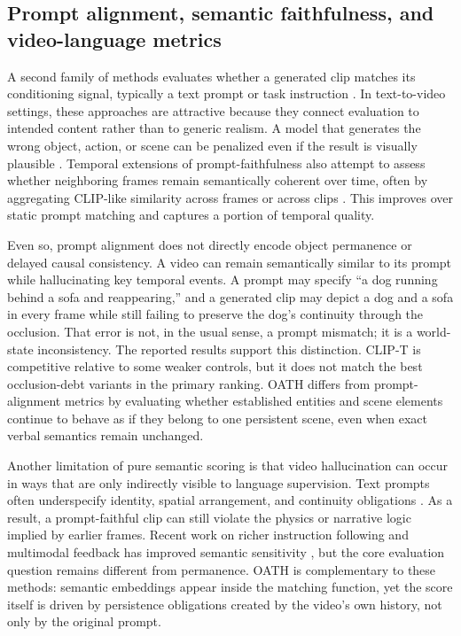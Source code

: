 \documentclass{article}
\begin{document}
\subsection{Prompt alignment, semantic faithfulness, and video-language metrics}

A second family of methods evaluates whether a generated clip matches its conditioning signal, typically a text prompt or task instruction \cite{clip2021,clipscore2021,tifa2023,pickscore2023,blip2_2023,instructblip2023}. In text-to-video settings, these approaches are attractive because they connect evaluation to intended content rather than to generic realism. A model that generates the wrong object, action, or scene can be penalized even if the result is visually plausible \cite{videopoet2024,modelscope_t2v2023,zeroscope2023}. Temporal extensions of prompt-faithfulness also attempt to assess whether neighboring frames remain semantically coherent over time, often by aggregating CLIP-like similarity across frames or across clips \cite{clip2021,clipscore2021,videoscore2024,t2vcompbench2024}. This improves over static prompt matching and captures a portion of temporal quality.

Even so, prompt alignment does not directly encode object permanence or delayed causal consistency. A video can remain semantically similar to its prompt while hallucinating key temporal events. A prompt may specify ``a dog running behind a sofa and reappearing,'' and a generated clip may depict a dog and a sofa in every frame while still failing to preserve the dog's continuity through the occlusion. That error is not, in the usual sense, a prompt mismatch; it is a world-state inconsistency. The reported results support this distinction. CLIP-T is competitive relative to some weaker controls, but it does not match the best occlusion-debt variants in the primary ranking. OATH differs from prompt-alignment metrics by evaluating whether established entities and scene elements continue to behave as if they belong to one persistent scene, even when exact verbal semantics remain unchanged.

Another limitation of pure semantic scoring is that video hallucination can occur in ways that are only indirectly visible to language supervision. Text prompts often underspecify identity, spatial arrangement, and continuity obligations \cite{tifa2023,pickscore2023,dreamdojo2026}. As a result, a prompt-faithful clip can still violate the physics or narrative logic implied by earlier frames. Recent work on richer instruction following and multimodal feedback has improved semantic sensitivity \cite{instructblip2023,gpt4v2023,llava2024}, but the core evaluation question remains different from permanence. OATH is complementary to these methods: semantic embeddings appear inside the matching function, yet the score itself is driven by persistence obligations created by the video's own history, not only by the original prompt.
\end{document}
